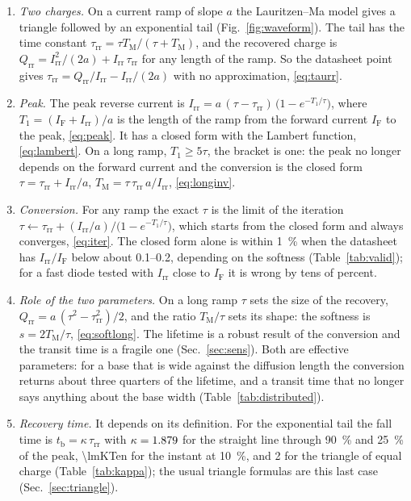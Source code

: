 \documentclass[10pt,a4paper]{scrartcl}
\newcommand{\IF}{I_\mathrm{F}}
\newcommand{\Irr}{I_\mathrm{rr}}
\newcommand{\Qrr}{Q_\mathrm{rr}}
\newcommand{\tb}{t_\mathrm{b}}
\newcommand{\taurr}{\tau_\mathrm{rr}}
\newcommand{\TM}{T_\mathrm{M}}
\newcommand{\Tone}{T_1}
\begin{document}
\begin{enumerate}
\item \emph{Two charges.} On a current ramp of slope $a$ the Lauritzen--Ma model gives a triangle followed by an exponential tail (Fig.~\ref{fig:waveform}). The tail has the time constant $\taurr = \tau\TM/(\tau+\TM)$, and the recovered charge is $\Qrr = \Irr^2/(2a) + \Irr\,\taurr$ for any length of the ramp. So the datasheet point gives $\taurr = \Qrr/\Irr - \Irr/(2a)$ with no approximation, \eqref{eq:taurr}.
\item \emph{Peak.} The peak reverse current is $\Irr = a\,(\tau-\taurr)\,\bigl(1-e^{-\Tone/\tau}\bigr)$, where $\Tone = (\IF+\Irr)/a$ is the length of the ramp from the forward current $\IF$ to the peak, \eqref{eq:peak}. It has a closed form with the Lambert function, \eqref{eq:lambert}. On a long ramp, $\Tone \geq 5\tau$, the bracket is one: the peak no longer depends on the forward current and the conversion is the closed form $\tau = \taurr + \Irr/a$, $\TM = \tau\,\taurr\,a/\Irr$, \eqref{eq:longinv}.
\item \emph{Conversion.} For any ramp the exact $\tau$ is the limit of the iteration $\tau \leftarrow \taurr + (\Irr/a)\big/\bigl(1-e^{-\Tone/\tau}\bigr)$, which starts from the closed form and always converges, \eqref{eq:iter}. The closed form alone is within \SI{1}{\percent} when the datasheet has $\Irr/\IF$ below about \numrange{0.1}{0.2}, depending on the softness (Table~\ref{tab:valid}); for a fast diode tested with $\Irr$ close to $\IF$ it is wrong by tens of percent.
\item \emph{Role of the two parameters.} On a long ramp $\tau$ sets the size of the recovery, $\Qrr = a\,(\tau^2-\taurr^2)/2$, and the ratio $\TM/\tau$ sets its shape: the softness is $s = 2\TM/\tau$, \eqref{eq:softlong}. The lifetime is a robust result of the conversion and the transit time is a fragile one (Sec.~\ref{sec:sens}). Both are effective parameters: for a base that is wide against the diffusion length the conversion returns about three quarters of the lifetime, and a transit time that no longer says anything about the base width (Table~\ref{tab:distributed}).
\item \emph{Recovery time.} It depends on its definition. For the exponential tail the fall time is $\tb = \kappa\,\taurr$ with $\kappa = 1.879$ for the straight line through \SI{90}{\percent} and \SI{25}{\percent} of the peak, \num{\lmKTen} for the instant at \SI{10}{\percent}, and 2 for the triangle of equal charge (Table~\ref{tab:kappa}); the usual triangle formulas are this last case (Sec.~\ref{sec:triangle}).

\end{enumerate}
\end{document}
